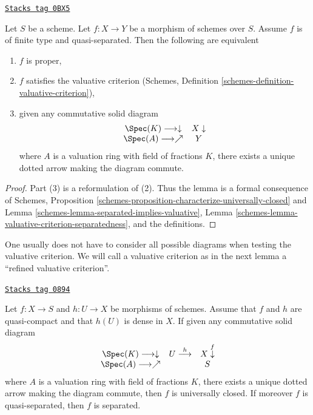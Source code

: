 \begin{lemma}

\label{morphisms-lemma-characterize-proper}
\href{https://stacks.math.columbia.edu/tag/0BX5}{\texttt{Stacks tag 0BX5}}

\begin{reference}
\cite[II Theorem 7.3.8]{EGA}
\end{reference}
Let $S$ be a scheme. Let $f : X \to Y$ be a morphism of schemes
over $S$. Assume $f$ is of finite type and quasi-separated.
Then the following are equivalent
\begin{enumerate}
\item $f$ is proper,
\item $f$ satisfies the valuative criterion
(Schemes, Definition \ref{schemes-definition-valuative-criterion}),
\item given any commutative solid diagram
$$
\begin{array}{cc}\Spec(K) \longrightarrow\downarrow & X \downarrow \\ \Spec(A) \longrightarrow\nearrow & Y\end{array}
$$
where $A$ is a valuation ring with field of fractions $K$, there exists
a unique dotted arrow making the diagram commute.
\end{enumerate}
\end{lemma}

\begin{proof}
Part (3) is a reformulation of (2). Thus the lemma is a formal
consequence of
Schemes, Proposition \ref{schemes-proposition-characterize-universally-closed}
and Lemma \ref{schemes-lemma-separated-implies-valuative},
Lemma \ref{schemes-lemma-valuative-criterion-separatedness},
and the definitions.
\end{proof}

One usually does not have to consider all possible diagrams
when testing the valuative criterion. We will call a valuative
criterion as in the next lemma a ``refined valuative criterion''.

\begin{lemma}
\label{morphisms-lemma-refined-valuative-criterion-universally-closed}
\href{https://stacks.math.columbia.edu/tag/0894}{\texttt{Stacks tag 0894}}

Let $f : X \to S$ and $h : U \to X$ be morphisms of schemes.
Assume that $f$ and $h$ are quasi-compact and that $h(U)$ is dense in $X$.
If given any commutative solid diagram
$$
\begin{array}{ccc}\Spec(K) \longrightarrow\downarrow & U \overset{h}{\longrightarrow} & X \overset{f}{\downarrow} \\ \Spec(A) \longrightarrow\nearrow &  & S\end{array}
$$
where $A$ is a valuation ring with field of fractions $K$, there
exists a unique dotted arrow making the diagram commute, then $f$
is universally closed. If moreover $f$ is quasi-separated, then
$f$ is separated.
\end{lemma}

